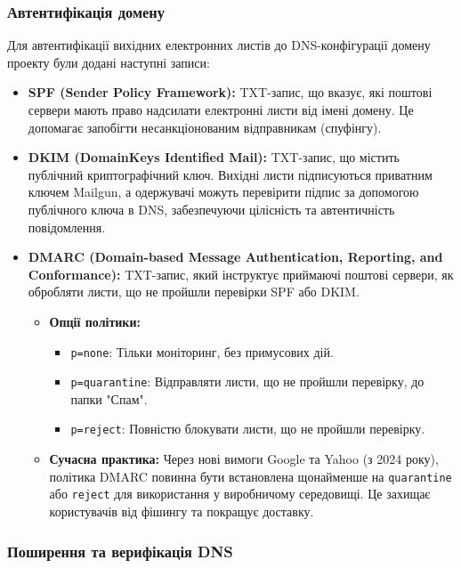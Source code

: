 \subsubsection{Автентифікація домену}

Для автентифікації вихідних електронних листів до DNS-конфігурації домену проекту були додані наступні записи:

\begin{itemize}
    \item \textbf{SPF (Sender Policy Framework):} TXT-запис, що вказує, які поштові сервери мають право надсилати електронні листи від імені домену. Це допомагає запобігти несанкціонованим відправникам (спуфінгу).
    \item \textbf{DKIM (DomainKeys Identified Mail):} TXT-запис, що містить публічний криптографічний ключ. Вихідні листи підписуються приватним ключем Mailgun, а одержувачі можуть перевірити підпис за допомогою публічного ключа в DNS, забезпечуючи цілісність та автентичність повідомлення.
    \item \textbf{DMARC (Domain-based Message Authentication, Reporting, and Conformance):} TXT-запис, який інструктує приймаючі поштові сервери, як обробляти листи, що не пройшли перевірки SPF або DKIM.
        \begin{itemize}
            \item \textbf{Опції політики:}
                \begin{itemize}
                    \item \texttt{p=none}: Тільки моніторинг, без примусових дій.
                    \item \texttt{p=quarantine}: Відправляти листи, що не пройшли перевірку, до папки "Спам".
                    \item \texttt{p=reject}: Повністю блокувати листи, що не пройшли перевірку.
                \end{itemize}
            \item \textbf{Сучасна практика:} Через нові вимоги Google та Yahoo (з 2024 року), політика DMARC повинна бути встановлена щонайменше на \texttt{quarantine} або \texttt{reject} для використання у виробничому середовищі. Це захищає користувачів від фішингу та покращує доставку.
        \end{itemize}
\end{itemize}

\subsubsection{Поширення та верифікація DNS}

